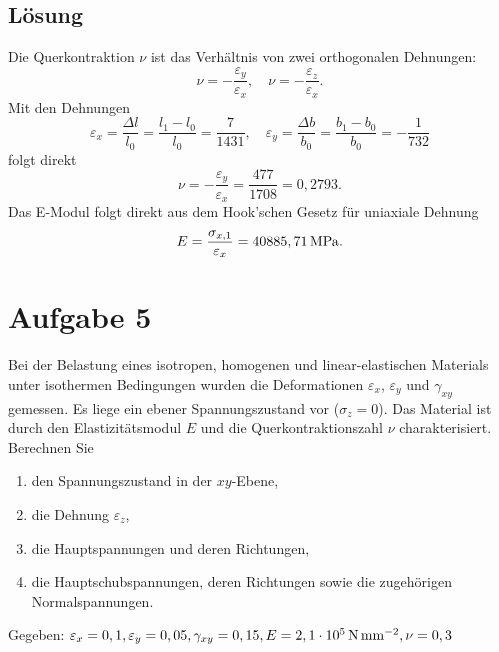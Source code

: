 \documentclass{exercise}
\begin{document}
    \subsection*{Lösung}
    Die Querkontraktion \(\nu\) ist das Verhältnis von zwei orthogonalen Dehnungen:
    \[
        \nu = -\frac{\varepsilon_y}{\varepsilon_x}, \quad \nu = -\frac{\varepsilon_z}{\varepsilon_x}.
    \]
    Mit den Dehnungen
    \[
        \varepsilon_x = \frac{\Delta l}{l_0} = \frac{l_1 - l_0}{l_0} = \frac{7}{1431}, \quad \varepsilon_y = \frac{\Delta b}{b_0} = \frac{b_1 - b_0}{b_0} = -\frac{1}{732}
    \]
    folgt direkt
    \[
        \nu = -\frac{\varepsilon_y}{\varepsilon_x} = \frac{477}{1708} = 0,2793.
    \]
    Das E-Modul folgt direkt aus dem Hook'schen Gesetz für uniaxiale Dehnung
    \[
        E = \frac{\sigma_{x, 1}}{\varepsilon_x} = 40885,71\,\si{\mega\pascal}.
    \]


    \section*{Aufgabe 5}

    \begin{problem}
        Bei der Belastung eines isotropen, homogenen und linear-elastischen Materials unter isothermen Bedingungen wurden die Deformationen \(\varepsilon_x\), \(\varepsilon_y\) und \(\gamma_{xy}\) gemessen.
        Es liege ein ebener Spannungszustand vor (\(\sigma_z = 0\)).
        Das Material ist durch den Elastizitätsmodul \(E\) und die Querkontraktionszahl \(\nu\) charakterisiert.
        Berechnen Sie
        \begin{enumerate}
            \item den Spannungszustand in der \(xy\)-Ebene,
            \item die Dehnung \(\varepsilon_z\),
            \item die Hauptspannungen und deren Richtungen,
            \item die Hauptschubspannungen, deren Richtungen sowie die zugehörigen Normalspannungen.
        \end{enumerate}
        Gegeben: \(\varepsilon_x = 0,1, \varepsilon_y = 0,05, \gamma_{xy} = 0,15, E = 2,1 \cdot 10^5\,\si{\newton\per\milli\meter\squared}, \nu = 0,3\)
    \end{problem}
\end{document}
